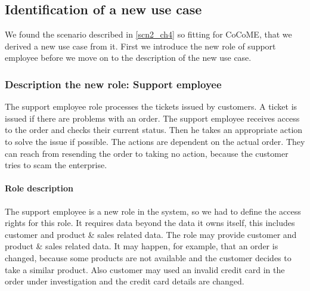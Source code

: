 \subsection{Identification of a new use case}
We found the scenario described in \autoref{scn2_ch4} so fitting for CoCoME, that we derived a new use case from it. First we introduce the new role of support employee before we move on to the description of the new use case.
\subsubsection{Description the new role: Support employee}
The support employee role processes the tickets issued by customers. A ticket is issued if there are problems with an order. The support employee receives access to the order and checks their current status. Then he takes an appropriate action to solve the issue if possible. The actions are dependent on the actual order. They can reach from resending the order to taking no action, because the customer tries to scam the enterprise.
\paragraph{Role description}
The support employee is a new role in the system, so we had to define the access rights for this role. It requires data beyond the data it owns itself, this includes customer and product \& sales related data. The role may provide customer and product \& sales related data. It may happen, for example, that an order is changed, because some products are not available and the customer decides to take a similar product. Also customer may used an invalid credit card in the order under investigation and the credit card details are changed.
